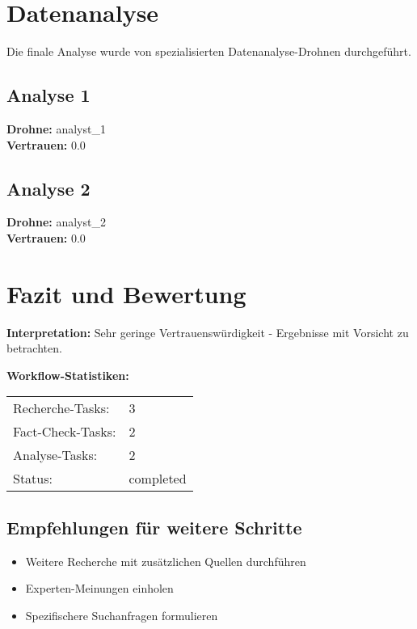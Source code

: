 \documentclass[12pt,a4paper]{article}
\begin{document}
\newpage
\section{Datenanalyse}

Die finale Analyse wurde von spezialisierten Datenanalyse-Drohnen durchgeführt.

\subsection{Analyse 1}

\textbf{Drohne:} analyst\_1\\
\textbf{Vertrauen:} 0.0%

\subsection{Analyse 2}

\textbf{Drohne:} analyst\_2\\
\textbf{Vertrauen:} 0.0%


\newpage
\section{Fazit und Bewertung}


\textbf{Interpretation:} Sehr geringe Vertrauenswürdigkeit - Ergebnisse mit Vorsicht zu betrachten.

\textbf{Workflow-Statistiken:}
\begin{tabular}{ll}
Recherche-Tasks: & 3 \\
Fact-Check-Tasks: & 2 \\
Analyse-Tasks: & 2 \\
Status: & completed \\
\end{tabular}

\subsection{Empfehlungen für weitere Schritte}

\begin{itemize}
\item Weitere Recherche mit zusätzlichen Quellen durchführen
\item Experten-Meinungen einholen
\item Spezifischere Suchanfragen formulieren
\end{itemize}
\end{document}
